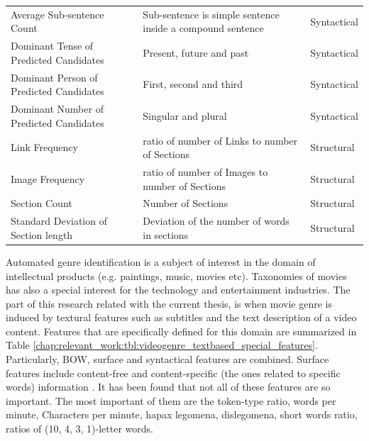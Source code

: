\begin{table}[t]
\begin{tabular}{p{4cm}p{7cm}p{3cm}}
        Average Sub-sentence Count & Sub-sentence is simple sentence inside a compound sentence & Syntactical \\
        Dominant Tense of  Predicted Candidates & Present, future and past & Syntactical \\
        Dominant Person of  Predicted Candidates & First, second and third & Syntactical \\
        Dominant Number of  Predicted Candidates & Singular and plural & Syntactical \\
		Link Frequency & ratio of number of Links to number of Sections  & Structural \\
        Image Frequency & ratio of number of Images to number of Sections  & Structural \\
        Section Count & Number of Sections & Structural \\
        Standard Deviation of Section length & Deviation of the number of words in sections & Structural \\
		\hline
	\end{tabular}
\end{table}

Automated genre identification is a subject of interest in the domain of intellectual products (e.g. paintings, music, movies etc). Taxonomies of movies has also a special interest for the technology and entertainment industries. The part of this research related with the current thesis, is when movie genre is induced by textural features such as subtitles and the text description of a video content. Features that are specifically defined for this domain are summarized in Table \ref{chap:relevant_work:tbl:videogenre_textbased_special_features}. Particularly, BOW, surface and syntactical features are combined. Surface features include content-free and content-specific (the ones related to specific words) information \parencite{lee2017text}. It has been found that not all of these features are so important. The most important of them are the token-type ratio, words per minute, Characters per minute, hapax legomena, dislegomena, short words ratio, ratios of (10, 4, 3, 1)-letter words. 

